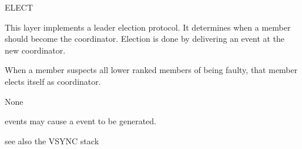 %
%
%
\begin{Layer}{ELECT}

This layer implements a leader election protocol.  It determines when a member
should become the coordinator.  Election is done by delivering an 
event at the new coordinator.

\begin{Protocol}
When a member suspects all lower ranked members of being faulty, that member elects
itself as coordinator.
\end{Protocol}

\begin{Parameters}
\item None
\end{Parameters}

\begin{Properties}
\item
{} events may cause a  event to be generated.
\end{Properties}

\begin{Sources}
\end{Sources}

\begin{GenEvent}
\end{GenEvent}

\begin{Testing}
\item
see also the VSYNC stack
\end{Testing}
\end{Layer}


